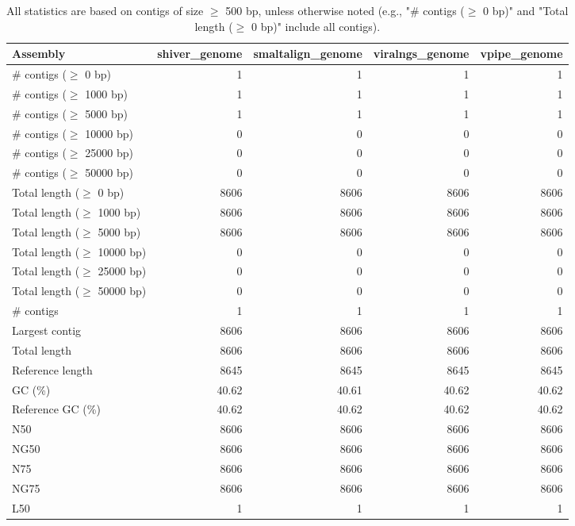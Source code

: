 \documentclass[12pt,a4paper]{article}
\begin{document}
\begin{table}[ht]
\begin{center}
\caption{All statistics are based on contigs of size $\geq$ 500 bp, unless otherwise noted (e.g., "\# contigs ($\geq$ 0 bp)" and "Total length ($\geq$ 0 bp)" include all contigs).}
\begin{tabular}{|l*{4}{|r}|}
\hline
Assembly & shiver\_genome & smaltalign\_genome & viralngs\_genome & vpipe\_genome \\ \hline
\# contigs ($\geq$ 0 bp) & 1 & 1 & 1 & 1 \\ \hline
\# contigs ($\geq$ 1000 bp) & 1 & 1 & 1 & 1 \\ \hline
\# contigs ($\geq$ 5000 bp) & 1 & 1 & 1 & 1 \\ \hline
\# contigs ($\geq$ 10000 bp) & 0 & 0 & 0 & 0 \\ \hline
\# contigs ($\geq$ 25000 bp) & 0 & 0 & 0 & 0 \\ \hline
\# contigs ($\geq$ 50000 bp) & 0 & 0 & 0 & 0 \\ \hline
Total length ($\geq$ 0 bp) & 8606 & 8606 & 8606 & 8606 \\ \hline
Total length ($\geq$ 1000 bp) & 8606 & 8606 & 8606 & 8606 \\ \hline
Total length ($\geq$ 5000 bp) & 8606 & 8606 & 8606 & 8606 \\ \hline
Total length ($\geq$ 10000 bp) & 0 & 0 & 0 & 0 \\ \hline
Total length ($\geq$ 25000 bp) & 0 & 0 & 0 & 0 \\ \hline
Total length ($\geq$ 50000 bp) & 0 & 0 & 0 & 0 \\ \hline
\# contigs & 1 & 1 & 1 & 1 \\ \hline
Largest contig & 8606 & 8606 & 8606 & 8606 \\ \hline
Total length & 8606 & 8606 & 8606 & 8606 \\ \hline
Reference length & 8645 & 8645 & 8645 & 8645 \\ \hline
GC (\%) & 40.62 & 40.61 & 40.62 & 40.62 \\ \hline
Reference GC (\%) & 40.62 & 40.62 & 40.62 & 40.62 \\ \hline
N50 & 8606 & 8606 & 8606 & 8606 \\ \hline
NG50 & 8606 & 8606 & 8606 & 8606 \\ \hline
N75 & 8606 & 8606 & 8606 & 8606 \\ \hline
NG75 & 8606 & 8606 & 8606 & 8606 \\ \hline
L50 & 1 & 1 & 1 & 1 \\ \hline

\end{tabular}
\end{center}
\end{table}
\end{document}
